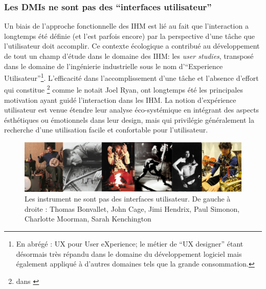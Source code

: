 \subsubsection{Les DMIs ne sont pas des ``interfaces utilisateur''}

\noindent Un biais de l'approche fonctionnelle des \gls{IHM} est lié au fait que l'interaction a longtemps été définie (et l'est parfois encore) par la perspective d'une tâche que l'utilisateur doit accomplir. Ce contexte écologique a contribué au développement de tout un champ d'étude dans le domaine des \gls{IHM}: les \textit{user studies}, transposé dans le domaine de l'ingénierie industrielle sous le nom d'``Experience Utilisateur''\footnote{En abrégé : UX pour User eXperience; le métier de ``UX designer'' étant désormais très répandu dans le domaine du développement logiciel mais également appliqué à d'autres domaines tels que la grande consommation.}. L'efficacité dans l'accomplissement d'une tâche et l'absence d'effort qui constitue \footnote{dans \cite{ryan_remarks_1991}} comme le notait Joel Ryan, ont longtemps été les principales motivation ayant guidé l'interaction dans les \gls{IHM}. La notion d'expérience utilisateur est venue étendre leur analyse éco-systémique en intégrant des aspects ésthétiques ou émotionnels dans leur design, mais qui privilégie généralement la recherche d'une utilisation facile et confortable pour l'utilisateur.\\
\begin{figure}[!htbp]
	\captionsetup{format=plain}%
	\includegraphics[width=\textwidth]{gfx/03_gesture/instrumentabusers.png}
	\caption[Les instrument ne sont pas des interfaces utilisateur]{Les instrument ne sont pas des interfaces utilisateur. De gauche à droite : Thomas Bonvallet, John Cage, Jimi Hendrix, Paul Simonon, Charlotte Moorman, Sarah Kenchington}
	\label{fig:gesture:abusers}
\end{figure}
